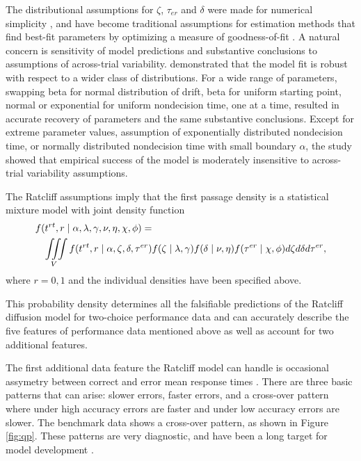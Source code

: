 \documentclass[12pt]{article}
\begin{document}
The distributional assumptions for
$\zeta$, $\tau_{er}$ and $\delta$ were made for numerical
simplicity \citep{Rat1978,RatRou1998,RatTue2002}, and have become traditional
assumptions for estimation methods that find best-fit parameters by optimizing a measure of goodness-of-fit \citep{Tue2004,VanTue2007,VosVos2007}. A natural concern is sensitivity of model predictions and substantive conclusions to assumptions of across-trial variability.
\citep{Rat2013} demonstrated that the model fit is robust with
respect to a wider class of distributions. For a wide range of parameters, swapping beta for normal distribution of drift, beta for uniform starting point, normal or exponential for uniform nondecision time, one at a time, resulted in accurate recovery of parameters and the same substantive conclusions. Except for extreme parameter values, assumption of exponentially distributed nondecision time, or normally distributed nondecision time with small boundary $\alpha$, the study showed that empirical success of the model is moderately insensitive to across-trial variability assumptions. 

The Ratcliff assumptions imply that the first passage density is a
statistical mixture model with joint density function
%
\begin{eqnarray}
\label{eqn:mixture}
\lefteqn{f(t^{rt}, r \mid \alpha, \lambda, \gamma, \nu, \eta, \chi, \phi) =} \\ 
& & \iiint\limits_V f(t^{rt}, r \mid \alpha, \zeta, \delta, \tau^{er})f(\zeta \mid \lambda, \gamma)f(\delta \mid \nu, \eta)f(\tau^{er} \mid \chi, \phi)d\zeta d\delta d\tau^{er} \nonumber,
\end{eqnarray}
%
where $r=0,1$ and the individual densities have been specified above.

This probability density determines all the falsifiable predictions
of the Ratcliff diffusion model for two-choice performance data and can
accurately describe the five features of performance data mentioned above as well as account for two additional features\citep{RatTue2002, Rat2002}. 

The first additional data feature the Ratcliff model can handle is occasional assymetry between correct and error mean response times \citep{RatMck2008, Wag2009}. There are three basic patterns that can arise: slower errors, faster errors, and a cross-over pattern where under high accuracy errors are faster and under low accuracy errors are slower. The benchmark data shows a cross-over pattern, as shown in Figure \ref{fig:qp}. These patterns are very diagnostic, and have been a long target for model development \citep{Lam1968,Rat1978,RatRou1998}.
\end{document}
